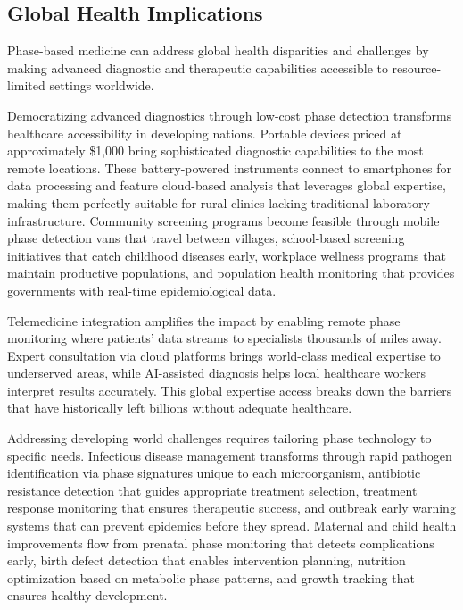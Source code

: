 \documentclass[12pt,a4paper]{report}
\begin{document}
\subsection{Global Health Implications}

Phase-based medicine can address global health disparities and challenges by making advanced diagnostic and therapeutic capabilities accessible to resource-limited settings worldwide.

Democratizing advanced diagnostics through low-cost phase detection transforms healthcare accessibility in developing nations. Portable devices priced at approximately \$1,000 bring sophisticated diagnostic capabilities to the most remote locations. These battery-powered instruments connect to smartphones for data processing and feature cloud-based analysis that leverages global expertise, making them perfectly suitable for rural clinics lacking traditional laboratory infrastructure. Community screening programs become feasible through mobile phase detection vans that travel between villages, school-based screening initiatives that catch childhood diseases early, workplace wellness programs that maintain productive populations, and population health monitoring that provides governments with real-time epidemiological data.

Telemedicine integration amplifies the impact by enabling remote phase monitoring where patients' data streams to specialists thousands of miles away. Expert consultation via cloud platforms brings world-class medical expertise to underserved areas, while AI-assisted diagnosis helps local healthcare workers interpret results accurately. This global expertise access breaks down the barriers that have historically left billions without adequate healthcare.

Addressing developing world challenges requires tailoring phase technology to specific needs. Infectious disease management transforms through rapid pathogen identification via phase signatures unique to each microorganism, antibiotic resistance detection that guides appropriate treatment selection, treatment response monitoring that ensures therapeutic success, and outbreak early warning systems that can prevent epidemics before they spread. Maternal and child health improvements flow from prenatal phase monitoring that detects complications early, birth defect detection that enables intervention planning, nutrition optimization based on metabolic phase patterns, and growth tracking that ensures healthy development.
\end{document}
